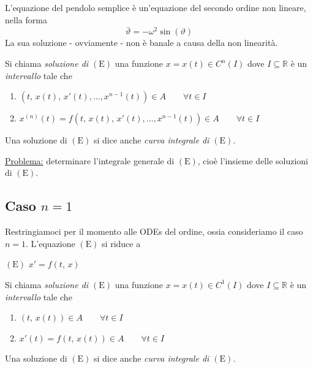 \begin{example}
L'equazione del pendolo semplice è un'equazione del secondo ordine non lineare, nella forma
$$
\overset{..}{\vartheta} = - \omega^2 \sin(\vartheta)
$$
La sua soluzione - ovviamente - non è banale a causa della non linearità.
\end{example}

\begin{definition}
Si chiama \emph{soluzione di $\mathrm{(E)}$} una funzione $x = x(t) \in C^n(I)$ dove $I \subseteq \mathbb{R}$ è un \emph{intervallo} tale che
\begin{enumerate}[labelindent=\parindent,leftmargin=*,label=\textnormal{(S$_\arabic*$)},start=1]
\item $\left( t,\,x(t),\,x'(t),\ldots,x^{n-1}(t) \right) \in A \qquad \forall t \in I$
\item $x^{(n)}(t) = f \left( t,\,x(t),\,x'(t),\ldots,x^{n-1}(t) \right) \in A \qquad \forall t \in I$
\end{enumerate}
Una soluzione di $\mathrm{(E)}$ si dice anche \emph{curva integrale di $\mathrm{(E)}$}.
\end{definition}

\noindent\underline{Problema:} determinare l'integrale generale di $\mathrm{(E)}$, cioè l'insieme delle soluzioni di $\mathrm{(E)}$.

\subsection{Caso $n=1$}
Restringiamoci per il momento alle ODEs del  ordine, ossia consideriamo il caso $n=1$. L'equazione $\mathrm{(E)}$ si riduce a
\begin{center}
$\mathrm{(E)}$
\hfill
$\displaystyle
x' = f \left( t,\,x \right)
$
\hfill \null \\
\end{center}

\begin{definition}[di soluzione di $\mathrm{(E)}$ per $n=1$]
Si chiama \emph{soluzione di $\mathrm{(E)}$} una funzione $x = x(t) \in C^1(I)$ dove $I \subseteq \mathbb{R}$ è un \emph{intervallo} tale che
\begin{enumerate}[labelindent=\parindent,leftmargin=*,label=\textnormal{(S$_\arabic*$)},start=1]
\item $\left( t,\,x(t) \right) \in A \qquad \forall t \in I$
\item $x'(t) = f \left( t,\,x(t) \right) \in A \qquad \forall t \in I$
\end{enumerate}
Una soluzione di $\mathrm{(E)}$ si dice anche \emph{curva integrale di $\mathrm{(E)}$}.
\end{definition}


